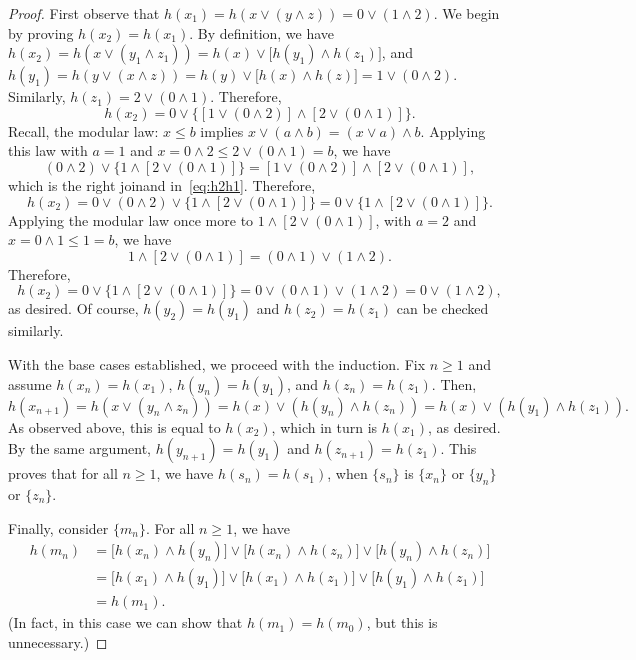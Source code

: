 \begin{proof}
First observe that $h(x_1) = h(x \vee (y \wedge z)) = 0 \vee (1 \wedge 2)$.  We begin by proving 
$h(x_{2}) = h(x_1)$.
By definition, we have 
$h(x_{2}) = h(x \vee (y_1 \wedge z_1)) = h(x) \vee \bigl[h(y_1) \wedge h(z_1)\bigr]$,
and $h(y_1) = h(y \vee (x \wedge z)) =   h(y) \vee \bigl[h(x) \wedge h(z)\bigr] 
= 1 \vee (0 \wedge 2)$. Similarly, $h(z_1) = 2 \vee (0 \wedge 1)$.
Therefore, 
\begin{equation}\label{eq:h2h1} 
  h(x_{2}) = 
0 \vee \bigl\{[1 \vee (0 \wedge 2)] \wedge [2 \vee (0 \wedge 1)]\bigr\}.
\end{equation}
Recall, the modular law: 
$x \leq b$ implies $x \vee (a \wedge b) = (x \vee a) \wedge b$.
Applying this law with $a = 1$ and $x = 0 \wedge 2 \leq 2 \vee (0 \wedge 1) = b$, we have 
\[
  (0 \wedge 2) \vee \bigl\{ 1 \wedge [2 \vee (0 \wedge 1)]\bigr\} = [1 \vee (0 \wedge 2)] \wedge [2 \vee (0 \wedge 1)],
\]  
which is the right joinand in~\ref{eq:h2h1}.  Therefore,
\[
  h(x_{2}) = 
  0 \vee 
  (0 \wedge 2) \vee \bigl\{ 1 \wedge [2 \vee (0 \wedge 1)]\bigr\} = 
  0 \vee 
  \bigl\{ 1 \wedge [2 \vee (0 \wedge 1)]\bigr\}.
\]
Applying the modular law once more to $1 \wedge [2 \vee (0 \wedge 1)]$, 
with $a = 2$ and $x = 0\wedge 1 \leq 1 = b$, we have
\[
  1 \wedge [2 \vee (0 \wedge 1)]  = (0 \wedge 1) \vee (1\wedge 2).
\]
Therefore,
\[
  h(x_{2}) = 
  0 \vee 
  \bigl\{ 1 \wedge [2 \vee (0 \wedge 1)]\bigr\} = 
  0 \vee (0 \wedge 1) \vee (1\wedge 2) = 0 \vee (1\wedge 2),
 \] 
as desired. 
Of course, $h(y_{2}) = h(y_1)$ and $h(z_{2}) = h(z_1)$ can be checked similarly.

With the base cases established, we proceed with the induction. 
Fix $n\geq 1$ and assume $h(x_{n}) = h(x_1)$, $h(y_{n}) = h(y_{1})$, and $h(z_{n}) = h(z_{1})$. 
  Then,
  \[h(x_{n+1}) = h(x \vee (y_n \wedge z_n))
    =h(x) \vee (h(y_n) \wedge h(z_n))= h(x) \vee (h(y_{1}) \wedge h(z_{1})).\]
As observed above, this is equal to $h(x_2)$, which in turn is 
$h(x_1)$, as desired.  By the same argument, $h(y_{n+1})=h(y_{1})$ and $h(z_{n+1})=h(z_{1})$.
This proves that for all $n \geq 1$, we have $h(s_{n})=h(s_{1})$, when 
$\{s_n\}$ is $\{x_n\}$ or $\{y_n\}$ or $\{z_n\}$.

Finally, consider $\{m_n\}$. 
For all $n\geq 1$, we have
\begin{align*}
  h(m_n) &= \bigl[h(x_n) \wedge h(y_n)\bigr] \vee \bigl[h(x_n) \wedge h(z_n)\bigr]\vee \bigl[h(y_n) \wedge h(z_n)\bigr] \\
  &= \bigl[h(x_1) \wedge h(y_1)\bigr] \vee \bigl[h(x_1) \wedge h(z_1)\bigr]\vee \bigl[h(y_1) \wedge h(z_1)\bigr]\\
  &=h(m_1).
  \end{align*}
(In fact, in this case we can show that $h(m_1) = h(m_0)$, but this is unnecessary.)



\end{proof}
